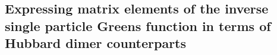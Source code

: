 \documentclass{article}
\numberwithin{equation}{section}
\begin{document}
\subsection{Expressing matrix elements of the inverse single particle Greens function in terms of Hubbard dimer counterparts}
\end{document}
